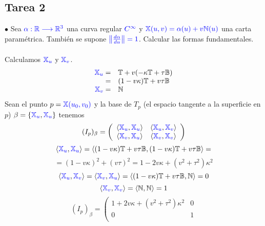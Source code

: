 \documentclass{article}
\newcommand{\bb}[1]{\mathbb{#1}}
\begin{document}
\begin{multicols}{2}
\section*{\textcolor{WildStrawberry}{Tarea 2}}

\noindent $\bullet$ Sea $\textcolor{blue}{\alpha: \bb{R}\longrightarrow \bb{R}^3}$ una curva regular $\textcolor{blue}{C^\infty}$ y $\textcolor{blue}{\bb{X}(u,v)=\alpha(u)+v\bb{N}(u)}$ una carta paramétrica. También se supone $\textcolor{blue}{\left\| \frac{d\alpha}{du} \right\|=1}$. Calcular las formas fundamentales.\\
\\
Calculamos $\textcolor{blue}{\bb{X}_u}$ y $\textcolor{blue}{\bb{X}_v}$.
$$
\begin{array}{rl}
    \textcolor{blue}{\bb{X}_u} = & \bb{T} + v (-\kappa \bb{T} + \tau \bb{B}) \\
    = & (1 - v\kappa) \bb{T} + v \tau \bb{B}\\
    \textcolor{blue}{\bb{X}_v} = & \bb{N}
\end{array}
$$
Sean el punto  $p=\textcolor{blue}{\bb{X}(u_0, v_0)}$ y la base de $T_p$ (el espacio tangente a la superficie en $p$) $\beta = \{ \textcolor{blue}{\bb{X}_u}, \textcolor{blue}{\bb{X}_u} \}$ tenemos
$$
(I_p)_\beta =
\left(\begin{array}{cc}
    \langle \textcolor{blue}{\bb{X}_u} , \textcolor{blue}{\bb{X}_u} \rangle & \langle \textcolor{blue}{\bb{X}_u} , \textcolor{blue}{\bb{X}_v} \rangle \\
    \langle \textcolor{blue}{\bb{X}_v} , \textcolor{blue}{\bb{X}_u} \rangle & \langle \textcolor{blue}{\bb{X}_v} , \textcolor{blue}{\bb{X}_v} \rangle \\
\end{array}\right)
$$
$$
\langle \textcolor{blue}{\bb{X}_u} , \textcolor{blue}{\bb{X}_u} \rangle = \langle (1 - v\kappa) \bb{T} + v \tau \bb{B}, (1 - v\kappa) \bb{T} + v \tau \bb{B} \rangle =
$$
$$
= (1 - v\kappa)^2 + (v \tau)^2 = 1 - 2 v\kappa + (v^2+\tau^2)\kappa^2
$$
$$
\langle \textcolor{blue}{\bb{X}_u} , \textcolor{blue}{\bb{X}_v} \rangle = \langle \textcolor{blue}{\bb{X}_v} , \textcolor{blue}{\bb{X}_u} \rangle = \langle (1 - v\kappa) \bb{T} + v \tau \bb{B}, \bb{N} \rangle = 0
$$
$$
\langle \textcolor{blue}{\bb{X}_v} , \textcolor{blue}{\bb{X}_v} \rangle = \langle \bb{N}, \bb{N} \rangle = 1
$$
$$
(I_p)_\beta =
\left(\begin{array}{cc}
    1 + 2 v\kappa + (v^2+\tau^2)\kappa^2 & 0 \\
    0 & 1 \\

\end{array}$$
\end{multicols}
\end{document}
